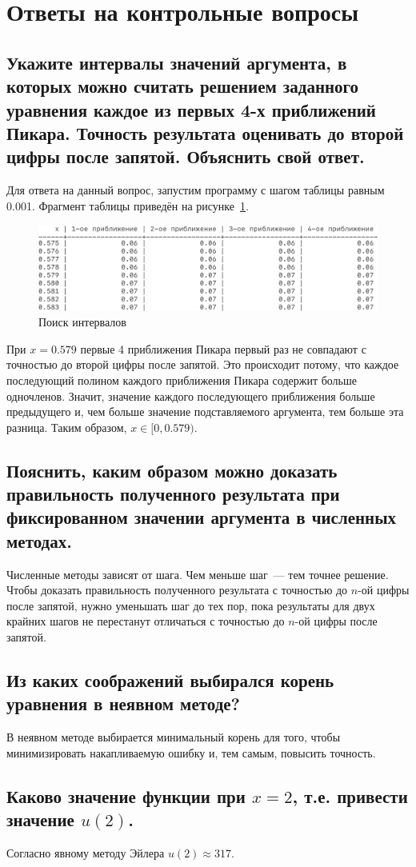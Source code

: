 \section{Ответы на контрольные вопросы}

\subsection{Укажите интервалы значений аргумента, в которых можно считать решением заданного уравнения каждое из первых 4-х  приближений Пикара. Точность результата оценивать до второй цифры после запятой. Объяснить свой ответ.}

Для ответа на данный вопрос, запустим программу с шагом таблицы равным 0.001. Фрагмент таблицы приведён на рисунке~\ref{img:answer1}.
\begin{figure}[H]
    \centering
    \caption{Поиск интервалов}\label{img:answer1}
    \includegraphics[scale=1.5]{images/answer1.png}
\end{figure}
При $x = 0.579$ первые 4 приближения Пикара первый раз не совпадают с точностью до второй цифры после запятой. Это происходит потому, что каждое последующий полином каждого приближения Пикара содержит больше одночленов. Значит, значение каждого последующего приближения больше предыдущего и, чем больше значение подставляемого аргумента, тем больше эта разница. Таким образом, $x \in [0, 0.579)$.

\subsection{Пояснить, каким образом можно доказать правильность полученного результата при фиксированном значении аргумента в численных методах.}
Численные методы зависят от шага. Чем меньше шаг~--- тем точнее решение. Чтобы доказать правильность полученного результата с точностью до $n$-ой цифры после запятой, нужно уменьшать шаг до тех пор, пока результаты для двух крайних шагов не перестанут отличаться с точностью до $n$-ой цифры после запятой.

\subsection{Из каких соображений выбирался корень уравнения в неявном методе?}
В неявном методе выбирается минимальный корень для того, чтобы минимизировать накапливаемую ошибку и, тем самым, повысить точность.

\subsection{Каково значение функции при $x=2$, т.е. привести значение $u(2)$.}
Согласно явному методу Эйлера $u(2) \approx 317$.

